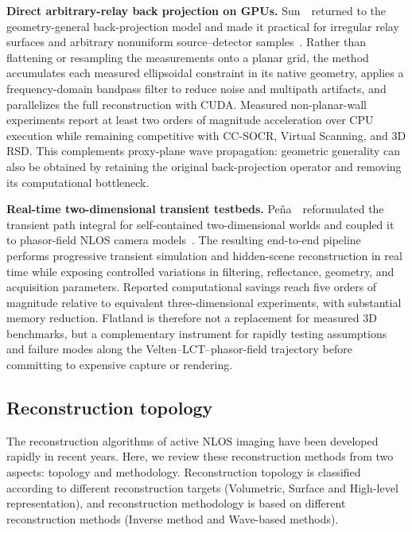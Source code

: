 \vspace{0.8mm}
\noindent \textbf{Direct arbitrary-relay back projection on GPUs.}
Sun~\etal~returned to the geometry-general back-projection model and made it practical for irregular relay surfaces and arbitrary nonuniform source--detector samples~\cite{sunCUDAIrregularRelayNLOS2026}. Rather than flattening or resampling the measurements onto a planar grid, the method accumulates each measured ellipsoidal constraint in its native geometry, applies a frequency-domain bandpass filter to reduce noise and multipath artifacts, and parallelizes the full reconstruction with CUDA. Measured non-planar-wall experiments report at least two orders of magnitude acceleration over CPU execution while remaining competitive with CC-SOCR, Virtual Scanning, and 3D RSD. This complements proxy-plane wave propagation: geometric generality can also be obtained by retaining the original back-projection operator and removing its computational bottleneck.

\vspace{0.8mm}
\noindent \textbf{Real-time two-dimensional transient testbeds.}
Pe\~na~\etal~reformulated the transient path integral for self-contained two-dimensional worlds and coupled it to phasor-field NLOS camera models~\cite{penaFlatlandNLOS2025}. The resulting end-to-end pipeline performs progressive transient simulation and hidden-scene reconstruction in real time while exposing controlled variations in filtering, reflectance, geometry, and acquisition parameters. Reported computational savings reach five orders of magnitude relative to equivalent three-dimensional experiments, with substantial memory reduction. Flatland is therefore not a replacement for measured 3D benchmarks, but a complementary instrument for rapidly testing assumptions and failure modes along the Velten--LCT--phasor-field trajectory before committing to expensive capture or rendering.

\subsection{Reconstruction topology}
The reconstruction algorithms of active NLOS imaging have been developed rapidly in recent years\cite{xinTheoryFermatPaths2019,otooleConfocalNonlineofsightImaging2018,liuPhasorFieldDiffraction2020}. Here, we review these reconstruction methods from two aspects: topology and methodology. Reconstruction topology is classified according to different reconstruction targets (Volumetric, Surface and High-level representation), and reconstruction methodology is based on different reconstruction methods (Inverse method and Wave-based methods).

